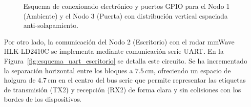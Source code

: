 \begin{figure}[H]
    \caption{Esquema de conexionado electrónico y puertos GPIO para el Nodo 1 (Ambiente) y el Nodo 3 (Puerta) con distribución vertical espaciada anti-solapamiento.}
    \label{fig:esquema_amb_puerta}
\end{figure}

Por otro lado, la comunicación del Nodo 2 (Escritorio) con el radar mmWave HLK-LD2410C se implementa mediante comunicación serie UART. En la Figura~\ref{fig:esquema_uart_escritorio} se detalla este circuito. Se ha incrementado la separación horizontal entre los bloques a $7.5\,\text{cm}$, ofreciendo un espacio de holgura de $4.7\,\text{cm}$ en el centro del bus serie que permite representar las etiquetas de transmisión (TX2) y recepción (RX2) de forma clara y sin colisiones con los bordes de los dispositivos.


